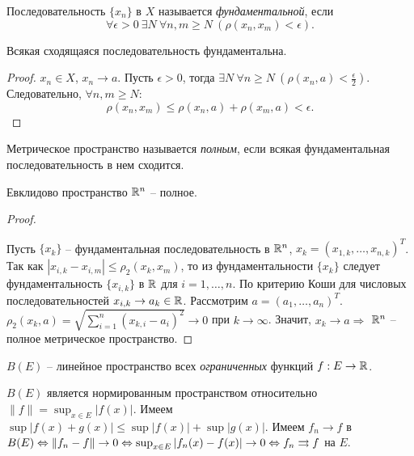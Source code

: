 \begin{definition}
    Последовательность $\{x_{n}\}$ в $X$ называется \textit{фундаментальной}, если 
    \[\forall \epsilon > 0 \ \exists N \ \forall n, m \geq N \ (\rho(x_{n}, x_{m}) < \epsilon).\]
\end{definition}

\begin{lemma}
    Всякая сходящаяся последовательность фундаментальна.
\end{lemma}

\begin{proof}
    $x_{n} \in X$, $x_{n} \to a$. Пусть $\epsilon > 0$, тогда $\exists N \ \forall n \geq N \ (\rho(x_{n}, a) < \frac{\epsilon}{2})$. Следовательно, $\forall n, m \geq N$:
    \[\rho (x_{n}, x_{m}) \leq \rho(x_{n}, a) + \rho(x_{m}, a) < \epsilon.\]
\end{proof}

\begin{definition}
    Метрическое пространство называется \textit{полным}, если всякая фундаментальная последовательность в нем сходится.
\end{definition}

\begin{theorem}
    Евклидово пространство $\mathbb{R}^{n}$ -- полное.
\end{theorem}

\begin{proof}~

    Пусть $\{x_{k}\}$ -- фундаментальная последовательность в $\mathbb{R}^{n}$, $x_{k} = (x_{1, k}, \ldots, x_{n, k})^{T}$. Так как $|x_{i, k} - x_{i, m}| \leq \rho_{2}(x_{k}, x_{m})$, то из фундаментальности $\{x_{k}\}$ следует фундаментальность $\{x_{i, k}\}$ в $\mathbb{R}$ для $i = 1, \ldots , n$. По критерию Коши для числовых последовательностей $x_{i, k} \to a_{k} \in \mathbb{R}$. Рассмотрим $a = (a_{1}, \ldots, a_{n})^{T}$. $\rho_{2}(x_{k}, a) = \sqrt{\sum_{i = 1}^{n}(x_{k, i} - a_{i})^{2}} \to 0$ при $k \to \infty$. Значит, $x_{k} \to a \Rightarrow$ $\mathbb{R}^{n}$ -- полное метрическое пространство.
\end{proof}

\begin{example}
    $B(E)$ -- линейное пространство всех \textit{ограниченных} функций $f: E \to \mathbb{R}$.

    $B(E)$ является нормированным пространством относительно $\|f\| = \sup_{x \in E}|f(x)|$. Имеем $\sup|f(x) + g(x)| \leq \sup|f(x)| + \sup|g(x)|$. Имеем $f_{n} \to f$ в $B(E) \Leftrightarrow \|f_{n} - f\| \to 0 \Leftrightarrow \sup_{x \in E}|f_{n}(x) - f(x)| \to 0 \Leftrightarrow f_{n} \rightrightarrows f$ на $E$.
\end{example}

